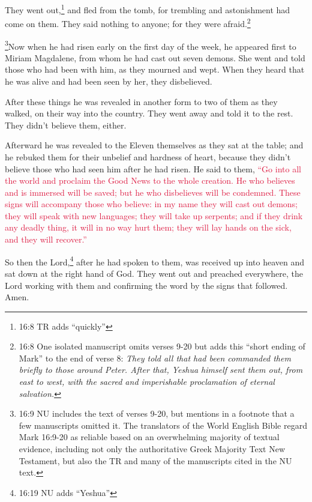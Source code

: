 \myverse{}They went out,\footnote{16:8 TR adds “quickly”} and fled from the tomb, for trembling and astonishment had come on
them. They said nothing to anyone; for they were afraid.\footnote{16:8 One isolated manuscript omits verses 9-20 but adds this “short ending of Mark” to the end of
	verse 8:
	\textit{They told all that had been commanded them briefly to those around Peter. After that, Yeshua
		himself sent them out, from east to west, with the sacred and imperishable proclamation of eternal salvation.}}

\myverse{}\footnote{16:9 NU includes the text of verses 9-20, but mentions in a footnote that a few manuscripts omitted
	it. The translators of the World English Bible regard
	Mark 16:9-20 as reliable based on an overwhelming majority of textual evidence,
	including not only the authoritative Greek Majority Text New Testament, but also the TR and many of the
	manuscripts cited in the NU text.}Now when he had risen early on the first day of the week, he
appeared first to Miriam Magdalene, from whom he had cast out seven demons.
\myverse{}She went and told those who had been with him, as they mourned and wept.
\myverse{}When they heard that he was alive and had been seen by her, they disbelieved.

\myverse{}After these things he was revealed in another form to two of
them as they walked, on their way into the country.
\myverse{}They went away and told it to the rest. They didn’t believe them, either.

\myverse{}Afterward he was revealed to the Eleven themselves as they sat
at the table; and he rebuked them for their unbelief and hardness of heart, because they didn’t believe
those who had seen him after he had risen.
\myverse{}He said to them,
\textcolor{crimson}{“Go into all the world and proclaim the Good News to the whole creation.
}
\myverse{}\textcolor{crimson}{He who believes and is immersed will be saved; but he who disbelieves
	will be condemned.
}
\myverse{}\textcolor{crimson}{These signs will accompany those who believe: in my name they will cast
	out demons; they will speak with new languages;
}
\myverse{}\textcolor{crimson}{they will take up serpents; and if they drink any deadly thing, it will
	in no way hurt them; they will lay hands on the sick, and they will recover.”}

\myverse{}So then the Lord,\footnote{16:19 NU adds “Yeshua”} after he had spoken to them, was received up into heaven and sat down
at the right hand of God.
\myverse{}They went out and preached everywhere, the Lord working with them and confirming
the word by the signs that followed. Amen.


